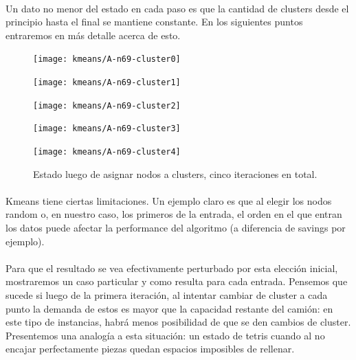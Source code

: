 \paragraph{}
Un dato no menor del estado en cada paso es que la cantidad de clusters desde el principio hasta el final se mantiene constante. En los siguientes puntos entraremos en más detalle acerca de esto.
\begin{figure}[H]
	\centering
	\begin{minipage}[t]{.3\textwidth}
		\centering
		\texttt{[image: kmeans/A-n69-cluster0]}
	\end{minipage}\qquad
	\begin{minipage}[t]{.3\textwidth}
		\centering
		\texttt{[image: kmeans/A-n69-cluster1]}
	\end{minipage}\qquad
	\begin{minipage}[t]{.3\textwidth}
		\centering
		\texttt{[image: kmeans/A-n69-cluster2]}
	\end{minipage}\qquad
	\begin{minipage}[t]{.3\textwidth}
		\centering
		\texttt{[image: kmeans/A-n69-cluster3]}
	\end{minipage}\qquad
	\begin{minipage}[t]{.3\textwidth}
		\centering
		\texttt{[image: kmeans/A-n69-cluster4]}
	\end{minipage}\qquad
	
	Estado luego de asignar nodos a clusters, cinco iteraciones en total.
\end{figure}

\paragraph{}
Kmeans tiene ciertas limitaciones. Un ejemplo claro es que al elegir los nodos random o, en nuestro caso, los primeros de la entrada, el orden en el que entran los datos puede afectar la performance del algoritmo (a diferencia de savings por ejemplo). 
\paragraph{}
Para que el resultado se vea efectivamente perturbado por esta elección inicial, mostraremos un caso particular y como resulta para cada entrada. Pensemos que sucede si luego de la primera iteración, al intentar cambiar de cluster a cada punto la demanda de estos es mayor que la capacidad restante del camión: en este tipo de instancias, habrá menos posibilidad de que se den cambios de cluster. Presentemos una analogía a esta situación: un estado de tetris cuando al no encajar perfectamente piezas quedan espacios imposibles de rellenar. 

